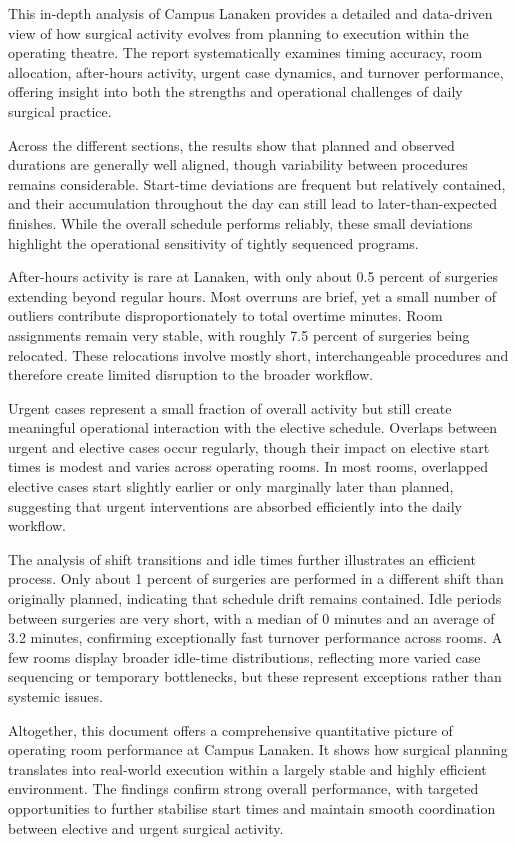 \documentclass[
]{article}
\begin{document}
This in-depth analysis of Campus Lanaken provides a detailed and
data-driven view of how surgical activity evolves from planning to
execution within the operating theatre. The report systematically
examines timing accuracy, room allocation, after-hours activity, urgent
case dynamics, and turnover performance, offering insight into both the
strengths and operational challenges of daily surgical practice.

Across the different sections, the results show that planned and
observed durations are generally well aligned, though variability
between procedures remains considerable. Start-time deviations are
frequent but relatively contained, and their accumulation throughout the
day can still lead to later-than-expected finishes. While the overall
schedule performs reliably, these small deviations highlight the
operational sensitivity of tightly sequenced programs.

After-hours activity is rare at Lanaken, with only about 0.5 percent of
surgeries extending beyond regular hours. Most overruns are brief, yet a
small number of outliers contribute disproportionately to total overtime
minutes. Room assignments remain very stable, with roughly 7.5 percent
of surgeries being relocated. These relocations involve mostly short,
interchangeable procedures and therefore create limited disruption to
the broader workflow.

Urgent cases represent a small fraction of overall activity but still
create meaningful operational interaction with the elective schedule.
Overlaps between urgent and elective cases occur regularly, though their
impact on elective start times is modest and varies across operating
rooms. In most rooms, overlapped elective cases start slightly earlier
or only marginally later than planned, suggesting that urgent
interventions are absorbed efficiently into the daily workflow.

The analysis of shift transitions and idle times further illustrates an
efficient process. Only about 1 percent of surgeries are performed in a
different shift than originally planned, indicating that schedule drift
remains contained. Idle periods between surgeries are very short, with a
median of 0 minutes and an average of 3.2 minutes, confirming
exceptionally fast turnover performance across rooms. A few rooms
display broader idle-time distributions, reflecting more varied case
sequencing or temporary bottlenecks, but these represent exceptions
rather than systemic issues.

Altogether, this document offers a comprehensive quantitative picture of
operating room performance at Campus Lanaken. It shows how surgical
planning translates into real-world execution within a largely stable
and highly efficient environment. The findings confirm strong overall
performance, with targeted opportunities to further stabilise start
times and maintain smooth coordination between elective and urgent
surgical activity.
\end{document}
